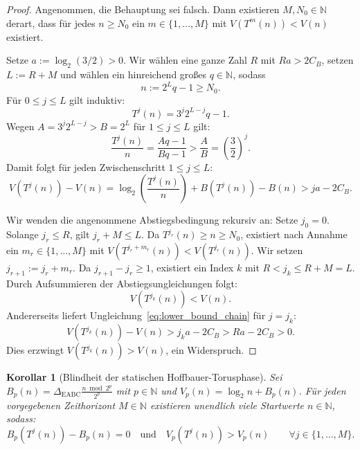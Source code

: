 \documentclass[11pt,reqno]{amsart}
\newtheorem{corollary}[theorem]{Korollar}
\theoremstyle{definition}
\theoremstyle{remark}
\numberwithin{equation}{section}
\begin{document}
\begin{proof}
Angenommen, die Behauptung sei falsch. Dann existieren $M, N_0 \in \mathbb{N}$ derart, dass für jedes $n \ge N_0$ ein $m \in \{1, \dots, M\}$ mit $V(T^m(n)) < V(n)$ existiert.

Setze $a := \log_2(3/2) > 0$. Wir wählen eine ganze Zahl $R$ mit $Ra > 2C_B$, setzen $L := R + M$ und wählen ein hinreichend großes $q \in \mathbb{N}$, sodass
\begin{equation}
n := 2^L q - 1 \ge N_0.
\end{equation}
Für $0 \le j \le L$ gilt induktiv:
\begin{equation}
T^j(n) = 3^j 2^{L-j} q - 1.
\end{equation}
Wegen $A = 3^j 2^{L-j} > B = 2^L$ für $1 \le j \le L$ gilt:
\begin{equation}
\frac{T^j(n)}{n} = \frac{Aq - 1}{Bq - 1} > \frac{A}{B} = \left(\frac{3}{2}\right)^j.
\end{equation}
Damit folgt für jeden Zwischenschritt $1 \le j \le L$:
\begin{equation}
V(T^j(n)) - V(n) = \log_2\left(\frac{T^j(n)}{n}\right) + B(T^j(n)) - B(n) > j a - 2C_B.
\label{eq:lower_bound_chain}
\end{equation}

Wir wenden die angenommene Abstiegsbedingung rekursiv an:
Setze $j_0 = 0$. Solange $j_r \le R$, gilt $j_r + M \le L$. Da $T^{j_r}(n) \ge n \ge N_0$, existiert nach Annahme ein $m_r \in \{1, \dots, M\}$ mit $V(T^{j_r + m_r}(n)) < V(T^{j_r}(n))$.
Wir setzen $j_{r+1} := j_r + m_r$. Da $j_{r+1} - j_r \ge 1$, existiert ein Index $k$ mit $R < j_k \le R + M = L$. 
Durch Aufsummieren der Abstiegsungleichungen folgt:
\begin{equation}
V(T^{j_k}(n)) < V(n).
\end{equation}
Andererseits liefert Ungleichung~\eqref{eq:lower_bound_chain} für $j = j_k$:
\begin{equation}
V(T^{j_k}(n)) - V(n) > j_k a - 2C_B > R a - 2C_B > 0.
\end{equation}
Dies erzwingt $V(T^{j_k}(n)) > V(n)$, ein Widerspruch.
\end{proof}

\begin{corollary}[Blindheit der statischen Hoffbauer-Torusphase]
\label{cor:torus_blindness}
Sei $B_p(n) = \Delta_{\mathrm{EABC}} \frac{n \bmod 2^p}{2^p}$ mit $p \in \mathbb{N}$ und $V_p(n) = \log_2 n + B_p(n)$. 
Für jeden vorgegebenen Zeithorizont $M \in \mathbb{N}$ existieren unendlich viele Startwerte $n \in \mathbb{N}$, sodass:
\begin{equation}
B_p(T^j(n)) - B_p(n) = 0 \quad \text{und} \quad V_p(T^j(n)) > V_p(n) \qquad \forall j \in \{1, \dots, M\}.
\end{equation}
\end{corollary}
\end{document}
